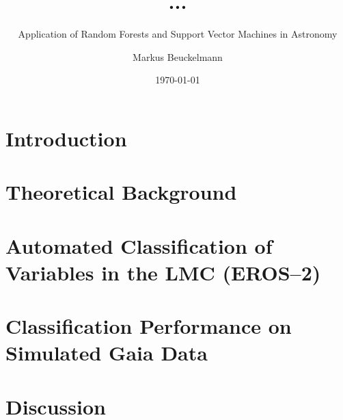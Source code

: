 

\title{...}
\subtitle{Application of Random Forests and Support Vector Machines in Astronomy}

\author{Markus Beuckelmann}
\date{\today}






\label{sec:abstract}

\tableofcontents

\newpage

\chapter{Introduction}
\label{sec:introduction}


\chapter{Theoretical Background}
\label{sec:theory}


\chapter{Automated Classification of Variables in the LMC (EROS--2)}
\label{sec:main}


\chapter{Classification Performance on Simulated Gaia Data}
\label{sec:main-gaia}


\chapter{Discussion}
\label{sec:discussion}


\cleardoublepage
{}
\listoffigures

\cleardoublepage
{}




\clearpage
{}

\label{sec:declaration}


